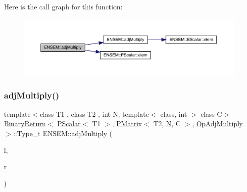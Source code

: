 Here is the call graph for this function\+:\nopagebreak
\begin{figure}[H]
\begin{center}
\leavevmode
\includegraphics[width=350pt]{df/d0a/group__primmatrix_ga47a69844104af73a48b189fb08811b87_cgraph}
\end{center}
\end{figure}
\mbox{\label{group__primmatrix_ga01de3db0f09195f592339c9241bd4692}} 
\subsubsection{\texorpdfstring{adjMultiply()}{adjMultiply()}\hspace{0.1cm}{\footnotesize\ttfamily [2/3]}}
{\footnotesize\ttfamily template$<$class T1 , class T2 , int N, template$<$ class, int $>$ class C$>$ \\
\mbox{\hyperlink{structENSEM_1_1BinaryReturn}{Binary\+Return}}$<$ \mbox{\hyperlink{classENSEM_1_1PScalar}{P\+Scalar}}$<$ T1 $>$, \mbox{\hyperlink{classENSEM_1_1PMatrix}{P\+Matrix}}$<$ T2, \mbox{\hyperlink{adat__devel_2lib_2hadron_2operator__name__util_8cc_a7722c8ecbb62d99aee7ce68b1752f337}{N}}, C $>$, \mbox{\hyperlink{structENSEM_1_1OpAdjMultiply}{Op\+Adj\+Multiply}} $>$\+::Type\+\_\+t E\+N\+S\+E\+M\+::adj\+Multiply (\begin{DoxyParamCaption}\item[{const \mbox{\hyperlink{classENSEM_1_1PScalar}{P\+Scalar}}$<$ T1 $>$ \&}]{l,  }\item[{const \mbox{\hyperlink{classENSEM_1_1PMatrix}{P\+Matrix}}$<$ T2, \mbox{\hyperlink{adat__devel_2lib_2hadron_2operator__name__util_8cc_a7722c8ecbb62d99aee7ce68b1752f337}{N}}, C $>$ \&}]{r }\end{DoxyParamCaption})\hspace{0.3cm}{\ttfamily [inline]}}


